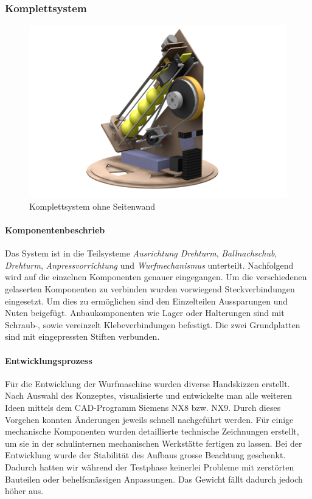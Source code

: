 \subsubsection{Komplettsystem}
\begin{figure}[h!]
	\centering
	\includegraphics[width=\linewidth]{../../fig/Render_Komplettsystem_5}
	\caption{Komplettsystem ohne Seitenwand}
	\label{fig:Komplettsystem}
\end{figure}
\paragraph{Komponentenbeschrieb}
Das System ist in die Teilsysteme \emph{Ausrichtung Drehturm}, \emph{Ballnachschub}, \emph{Drehturm}, \emph{Anpressvorrichtung} und \emph{Wurfmechanismus} unterteilt. Nachfolgend wird auf die einzelnen Komponenten genauer eingegangen. Um die verschiedenen gelaserten Komponenten zu verbinden wurden vorwiegend Steckverbindungen eingesetzt. Um dies zu ermöglichen sind den Einzelteilen Aussparungen und Nuten beigefügt. Anbaukomponenten wie Lager oder Halterungen sind mit Schraub-, sowie vereinzelt Klebeverbindungen befestigt. Die zwei Grundplatten sind mit eingepressten Stiften verbunden.

\paragraph{Entwicklungsprozess}
Für die Entwicklung der Wurfmaschine wurden diverse Handskizzen erstellt. Nach Auswahl des Konzeptes, visualisierte und entwickelte man alle weiteren Ideen mittels dem CAD-Programm Siemens NX8 bzw. NX9. Durch dieses Vorgehen konnten Änderungen jeweils schnell nachgeführt werden. Für einige mechanische Komponenten wurden detaillierte technische Zeichnungen erstellt, um sie in der schulinternen mechanischen Werkstätte fertigen zu lassen. Bei der Entwicklung wurde der Stabilität des Aufbaus grosse Beachtung geschenkt. Dadurch hatten wir während der Testphase keinerlei Probleme mit zerstörten Bauteilen oder behelfsmässigen Anpassungen. Das Gewicht fällt dadurch jedoch höher aus. 
